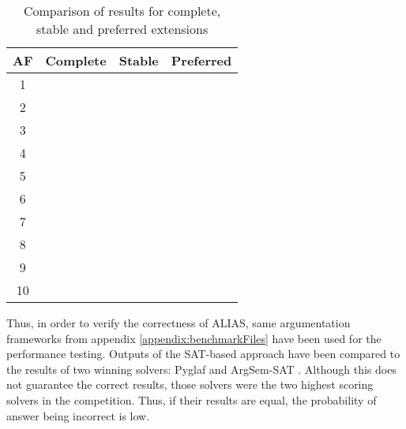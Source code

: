 \begin{table}[!h]
	\centering
	\caption{Comparison of results for complete, stable and preferred extensions}
	\label{table:prefCorrectnes}
	\begin{tabular}{|c|c|c|c|}
		AF	& Complete & Stable & Preferred \\ \hline \hline
		1 &   \cellcolor{green}\Checkmark    &   \cellcolor{green}\Checkmark     &    \cellcolor{green}\Checkmark        \\ \hline
		2 &   \cellcolor{green}\Checkmark    &   \cellcolor{green}\Checkmark     &    \cellcolor{green}\Checkmark        \\\hline
		3 &   \cellcolor{green}\Checkmark    &   \cellcolor{green}\Checkmark     &    \cellcolor{green}\Checkmark        \\\hline
		4 &   \cellcolor{green}\Checkmark    &   \cellcolor{green}\Checkmark     &    \cellcolor{green}\Checkmark        \\\hline
		5 &   \cellcolor{green}\Checkmark    &   \cellcolor{green}\Checkmark     &    \cellcolor{green}\Checkmark        \\\hline
		6 &   \cellcolor{green}\Checkmark    &   \cellcolor{green}\Checkmark     &    \cellcolor{green}\Checkmark        \\\hline
		7 &   \cellcolor{green}\Checkmark    &   \cellcolor{green}\Checkmark     &    \cellcolor{green}\Checkmark        \\\hline
		8 &   \cellcolor{green}\Checkmark    &   \cellcolor{green}\Checkmark     &    \cellcolor{green}\Checkmark        \\\hline
		9 &   \cellcolor{green}\Checkmark    &    \cellcolor{green}\Checkmark    &       \cellcolor{red}\cross     \\\hline
		10 &   \cellcolor{red}\cross    &    \cellcolor{green}\Checkmark    &       \cellcolor{green}\Checkmark \\  \hline
	\end{tabular}
\end{table}

Thus, in order to verify the correctness of ALIAS, same argumentation frameworks from appendix \ref{appendix:benchmarkFiles} have been used for the performance testing. Outputs of the SAT-based approach have been compared to the results of two winning solvers: Pyglaf \citep{pyglaf} and ArgSem-SAT \citep{argsemsat}. Although this does not guarantee the correct results, those solvers were the two highest scoring solvers in the competition. Thus, if their results are equal, the probability of answer being incorrect is low.

